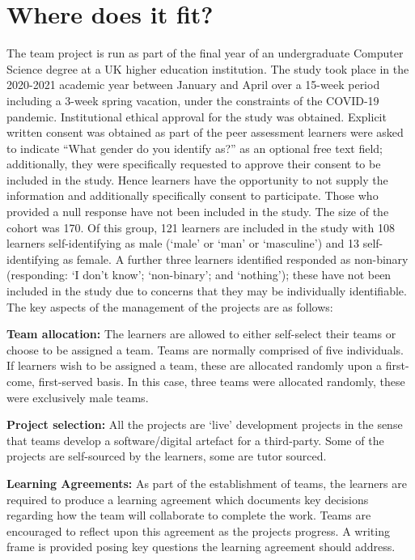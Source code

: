 \documentclass[sigconf, anonymous=false]{acmart}
\begin{document}
\section{Where does it fit?}
The team project is run as part of the final year of an undergraduate
Computer Science degree at a UK higher education institution. The
study took place in the 2020-2021 academic year between January and
April over a 15-week period including a 3-week spring vacation, under
the constraints of the COVID-19 pandemic. Institutional ethical
approval for the study was obtained. Explicit written consent was
obtained as part of the peer assessment learners were asked to
indicate ``What gender do you identify as?'' as an optional free text
field; additionally, they were specifically requested to approve their
consent to be included in the study. Hence learners have the
opportunity to not supply the information and additionally
specifically consent to participate. Those who provided a null
response have not been included in the study. The size of the cohort
was 170. Of this group, 121 learners are included in the study with
108 learners self-identifying as male (`male' or `man' or `masculine')
and 13 self-identifying as female. A further three learners identified
responded as non-binary (responding: `I don't know'; `non-binary'; and
`nothing'); these have not been included in the study due to concerns
that they may be individually identifiable. The key aspects of the
management of the projects are as follows:

\textbf{Team allocation:}
The learners are allowed to either self-select their teams or choose
to be assigned a team. Teams are normally comprised of five
individuals. If learners wish to be assigned a team, these are
allocated randomly upon a first-come, first-served basis. In this
case, three teams were allocated randomly, these were exclusively male
teams.

\textbf {Project selection:}
All the projects are `live' development projects in the sense that
teams develop a software/digital artefact for a third-party. Some of the
projects are self-sourced by the learners, some are tutor sourced.

\textbf{Learning Agreements:}
As part of the establishment of teams, the learners are required to
produce a learning agreement which documents key decisions regarding
how the team will collaborate to complete the work. Teams are
encouraged to reflect upon this agreement as the projects progress. A
writing frame is provided posing key questions the learning agreement
should address.
\end{document}

